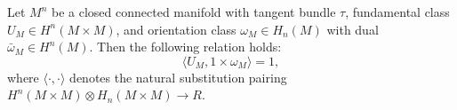 Let $M^n$ be a closed connected manifold with tangent bundle $\tau$, fundamental class $U_M \in H^n(M \times M)$, and orientation class $\omega_M \in H_n(M)$ with dual $\bar{\omega}_M \in H^n(M)$. Then the following relation holds:
$$\langle U_M, 1 \times \omega_M \rangle = 1,$$
where $\langle \cdot, \cdot \rangle$ denotes the natural substitution pairing $H^n(M \times M) \otimes H_n(M \times M) \to R$.
